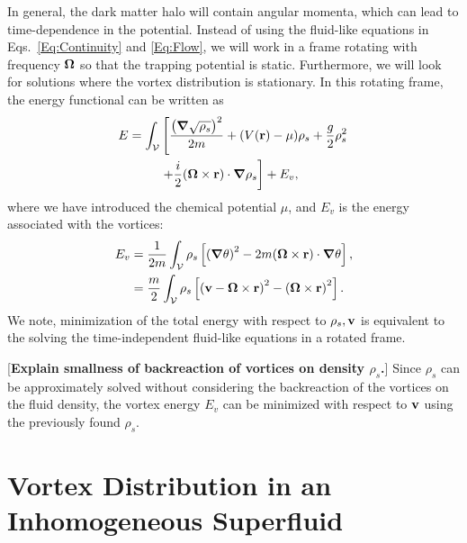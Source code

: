 \documentclass[aps,prd,twocolumn,nofootinbib,superscriptaddress]{revtex4-1}
\newcommand{\bfnab}{{\boldsymbol \nabla}}
\begin{document}
In general, the dark matter halo will contain angular momenta, which can lead to time-dependence in the potential.  Instead of using the fluid-like equations in Eqs.~\eqref{Eq:Continuity} and \eqref{Eq:Flow}, we will work in a frame rotating with frequency ${\bf \Omega}$ so that the trapping potential is static.  Furthermore, we will look for solutions where the vortex distribution is stationary.  In this rotating frame, the energy functional can be written as
\begin{align}
E = \int_\mathcal{V}&\left[\frac{\left(\bfnab \sqrt{\rho_s}\right)^2}{2m} + (V({\bf r})-\mu)\rho_s + \frac{g}{2}\rho_s^2\right.\nonumber\\
&\left. + \frac{i}{2}({\bf \Omega}\times {\bf r})\cdot\bfnab\rho_s\right] + E_v,
\end{align}
where we have introduced the chemical potential $\mu$, and $E_v$ is the energy associated with the vortices:
\begin{align}
E_v &= \frac{1}{2m}\int_\mathcal{V}\rho_s\left[\left(\bfnab \theta\right)^2 - 2m({\bf \Omega}\times {\bf r})\cdot \bfnab \theta \right],\nonumber\\
&= \frac{m}{2}\int_\mathcal{V}\rho_s\left[\left({\bf v} - {\bf \Omega}\times {\bf r}\right)^2 - \left({\bf \Omega}\times{\bf r}\right)^2\right].
\end{align}
We note, minimization of the total energy with respect to $\rho_s, {\bf v}$ is equivalent to the solving the time-independent fluid-like equations in a rotated frame.  

[{\bf Explain smallness of backreaction of vortices on density $\rho_s$.}] Since $\rho_s$ can be approximately solved without considering the backreaction of the vortices on the fluid density, the vortex energy $E_v$ can be minimized with respect to ${\bf v}$ using the previously found $\rho_s$.



\section{Vortex Distribution in an Inhomogeneous Superfluid}
\label{Sec:Distribution}
\end{document}
